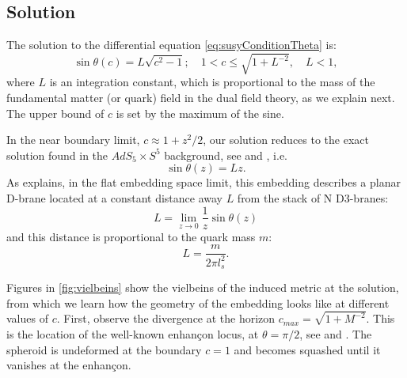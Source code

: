 \subsection{Solution}

The solution to the differential equation \eqref{eq:susyConditionTheta} is:
\begin{equation}\label{eq:susyConditionSolution}
\boxed{\sin\theta(c) = L \sqrt{c^2-1}; \quad 1 < c \leq \sqrt{1+L^{-2}}, \quad L < 1},
\end{equation}
where $L$ is an integration constant, which is proportional to the mass of the fundamental matter (or quark) field in the dual field theory, as we explain next. The upper bound of $c$ is set by the maximum of the sine.

In the near boundary limit, $c \approx 1 + z^2/2$, our solution reduces to the exact solution found in the $AdS_5 \times S^5$ background, see \cite{Karch:2002sh} and \cite{Karch:2005ms}, i.e.
\begin{equation}
 \sin\theta(z) = L z.
\end{equation}
As \cite{Karch:2005ms} explains, in the flat embedding space limit, this embedding describes a planar D-brane located at a constant distance away $L$ from the stack of N D3-branes:
\begin{equation}
 L = \lim_{z \rightarrow 0 } \frac{1}{z} \sin\theta(z)
\end{equation}
and this distance is proportional to the quark mass $m$:
\begin{equation}
 L = \dfrac{m}{2 \pi l_s^2}.
\end{equation}


Figures in \ref{fig:vielbeins} show the vielbeins of the induced metric at the solution, from which we learn how the geometry of the embedding looks like at different values of $c$. First, observe the divergence at the horizon $c_{max}=\sqrt{1+M^{-2}}$. This is the location of the well-known enhançon locus, at $\theta = \pi/2$, see \cite{Buchel:2000cn} and \cite{Evans:2000ct}. The spheroid is undeformed at the boundary $c=1$ and becomes squashed until it vanishes at the enhançon. 


